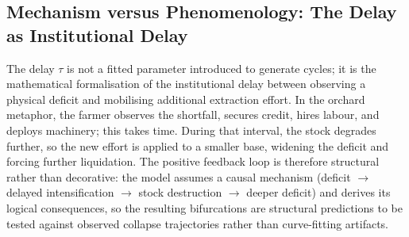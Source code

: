 \documentclass[twocolumn,10pt]{article}
\begin{document}
\subsection{Mechanism versus Phenomenology: The Delay as Institutional Delay}
\label{sec:mechanism-vs-phenomenology}
The delay \(\tau\) is not a fitted parameter introduced to generate cycles; it is the mathematical formalisation of the institutional delay between observing a physical deficit and mobilising additional extraction effort. In the orchard metaphor, the farmer observes the shortfall, secures credit, hires labour, and deploys machinery; this takes time. During that interval, the stock degrades further, so the new effort is applied to a smaller base, widening the deficit and forcing further liquidation. The positive feedback loop is therefore structural rather than decorative: the model assumes a causal mechanism (deficit $\to$ delayed intensification $\to$ stock destruction $\to$ deeper deficit) and derives its logical consequences, so the resulting bifurcations are structural predictions to be tested against observed collapse trajectories rather than curve-fitting artifacts.
\end{document}
